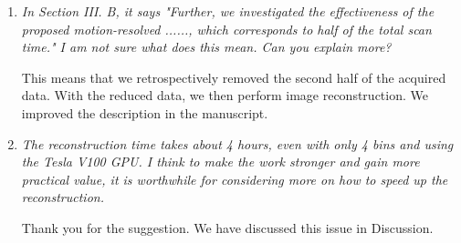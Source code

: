 \documentclass[a4paper,11pt]{report}
\begin{document}
\begin{enumerate}[resume]
	\item \textit{In Section III. B, it says "Further, we investigated the effectiveness of the proposed motion-resolved ......, which corresponds to half of the total scan time." I am not sure what does this mean. Can you explain more?}

\hspace{1em} This means that we retrospectively removed the second half of the acquired data.
With the reduced data, we then perform image reconstruction. We improved the description
in the manuscript.

	\item \textit{The reconstruction time takes about 4 hours, even with only 4 bins and using the Tesla V100 GPU. I think to make the work stronger and gain more practical value, it is worthwhile for considering more on how to speed up the reconstruction.}

\hspace{1em} Thank you for the suggestion. We have discussed this issue in Discussion.

\end{enumerate}
\end{document}
